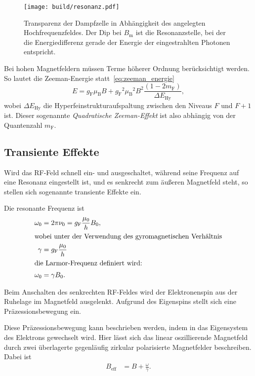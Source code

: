 \begin{figure}[ht]
  \centering
  \texttt{[image: build/resonanz.pdf]}
  \caption{%
    Transparenz der Dampfzelle in Abhängigkeit des angelegten
    Hochfrequenzfeldes.\cite{anleitung}
    Der Dip bei $B_\text{m}$ ist die Resonanzstelle, bei der die
    Energiedifferenz gerade der Energie der eingestrahlten Photonen entspricht.
  }%
  \label{fig:resonanz}
\end{figure}


Bei hohen Magnetfeldern müssen Terme höherer Ordnung berücksichtigt werden.
So lautet die Zeeman-Energie statt~\eqref{eq:zeeman_energie}
\begin{equation}
	\label{eq:quad_zee}
  E = g_\text{F} \mu_\text{B} B + {g_\text{F}}^2 {\mu_\text{B}}^2 {B}^2 \frac{\left(1
  - 2 m_\text{F} \right)}{\Delta E_\text{Hy}},
\end{equation}
wobei $\Delta E_\text{Hy}$ die Hyperfeinstrukturaufspaltung zwischen den
Niveaus $F$ und $F + 1$ ist.
Dieser sogenannte \textit{Quadratische Zeeman-Effekt} ist also abhängig von
der Quantenzahl $m_\text{F}$.


\subsection{Transiente Effekte}%
\label{sub:transiente_effekte}

Wird das RF-Feld schnell ein- und ausgeschaltet, während seine Frequenz auf eine
Resonanz eingestellt ist, und es senkrecht zum äußeren Magnetfeld steht,
so stellen sich sogenannte transiente Effekte ein.

Die resonante Frequenz ist
\begin{align}
  \omega_0 &= 2 \pi \nu_0 = g_\text{F} \frac{\mu_0}{h} B_0, \\
  \intertext{wobei unter der Verwendung des gyromagnetischen Verhältnis}
  \gamma &= g_\text{F} \frac{\mu_0}{h} \\
  \intertext{die Larmor-Frequenz definiert wird:}
  \omega_0 &= \gamma B_0.
\end{align}

Beim Anschalten des senkrechten RF-Feldes wird der Elektronenspin aus der
Ruhelage im Magnetfeld ausgelenkt.
Aufgrund des Eigenspins stellt sich eine Präzessionsbewegung ein.

Diese Präzessionsbewegung kann beschrieben werden, indem in das Eigensystem des
Elektrons gewechselt wird.
Hier lässt sich das linear oszillierende Magnetfeld durch zwei überlagerte
gegenläufig zirkular polarisierte Magnetfelder beschreiben.
Dabei ist
\begin{align}
  B_\text{eff} &= B + \frac{\omega}{\gamma}.
\end{align}

